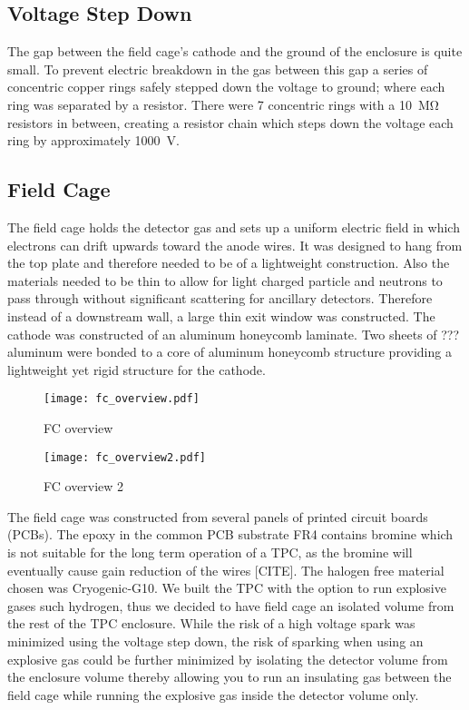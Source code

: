 \subsection{Voltage Step Down}
The gap between the field cage's cathode and the ground of the enclosure is quite small. To prevent electric breakdown in the gas between this gap a series of concentric copper rings safely stepped down the voltage to ground; where each ring was separated by a resistor. There were 7 concentric rings with a \SI{10}{\mega\ohm} resistors in between, creating a resistor chain which steps down the voltage each ring by approximately \SI{1000}{\volt}.

\subsection{Field Cage}

The field cage holds the detector gas and sets up a uniform electric field in which electrons can drift upwards toward the anode wires. It was designed to hang from the top plate and therefore needed to be of a lightweight construction. Also the materials needed to be thin to allow for light charged particle and neutrons to pass through without significant scattering for ancillary detectors. Therefore instead of a downstream wall, a large thin exit window was constructed. The cathode was constructed of an aluminum honeycomb laminate. Two sheets of ??? aluminum were bonded to a core of aluminum honeycomb structure providing a lightweight yet rigid structure for the cathode. 

\begin{figure}[!htb]
\texttt{[image: fc\_overview.pdf]}
\label{fig:fc_overview}
\caption{FC overview}
\end{figure}


\begin{figure}[!htb]
\texttt{[image: fc\_overview2.pdf]}
\label{fig:fc_overview2}
\caption{FC overview 2}
\end{figure}

The field cage was constructed from several panels of printed circuit boards (PCBs). The epoxy in the common PCB substrate FR4 contains bromine which is not suitable for the long term operation of a TPC, as the bromine will eventually cause gain reduction of the wires [CITE]. The halogen free material chosen was Cryogenic-G10. We built the TPC with the option to run explosive gases such hydrogen, thus we decided to have field cage an isolated volume from the rest of the TPC enclosure. While the risk of a high voltage spark was minimized using the voltage step down, the risk of sparking when using an explosive gas could be further minimized by isolating the detector volume from the enclosure volume thereby allowing you to run an insulating gas between the field cage while running the explosive gas inside the detector volume only.  


